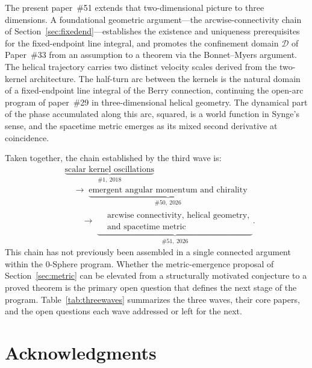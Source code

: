 \documentclass[%
 reprint, amsmath,amssymb, aps, prb, ]{revtex4-2}
\numberwithin{equation}{section}
\begin{document}
The present paper~\#51 extends that two-dimensional picture to three dimensions. A foundational geometric argument---the arcwise-connectivity chain of Section~\ref{sec:fixedend}---establishes the existence and uniqueness prerequisites for the fixed-endpoint line integral, and promotes the confinement domain $\mathcal{D}$ of Paper~\#33 from an assumption to a theorem via the Bonnet--Myers argument. The helical trajectory carries two distinct velocity scales derived from the two-kernel architecture. The half-turn arc between the kernels is the natural domain of a fixed-endpoint line integral of the Berry connection, continuing the open-arc program of paper~\#29 in three-dimensional helical geometry. The dynamical part of the phase accumulated along this arc, squared, is a world function in Synge's sense, and the spacetime metric emerges as its mixed second derivative at coincidence.

Taken together, the chain established by the third wave is:
\begin{align*}
&\underbrace{\text{scalar kernel oscillations}}_{\#1,\ 2018}\\[1.2ex]
&\hspace{1em}\longrightarrow\;
\underbrace{\text{emergent angular momentum and chirality}}_{\#50,\ 2026}\\[1.2ex]
&\hspace{2em}\longrightarrow\;
\underbrace{
\begin{aligned}
&\text{arcwise connectivity, helical geometry,}\\
&\text{and spacetime metric}
\end{aligned}
}_{\#51,\ 2026}.
\end{align*}
This chain has not previously been assembled in a single connected argument within the 0-Sphere program. Whether the metric-emergence proposal of Section~\ref{sec:metric} can be elevated from a structurally motivated conjecture to a proved theorem is the primary open question that defines the next stage of the program. Table~\ref{tab:threewaves} summarizes the three waves, their core papers, and the open questions each wave addressed or left for the next.

\section*{Acknowledgments}
\end{document}
